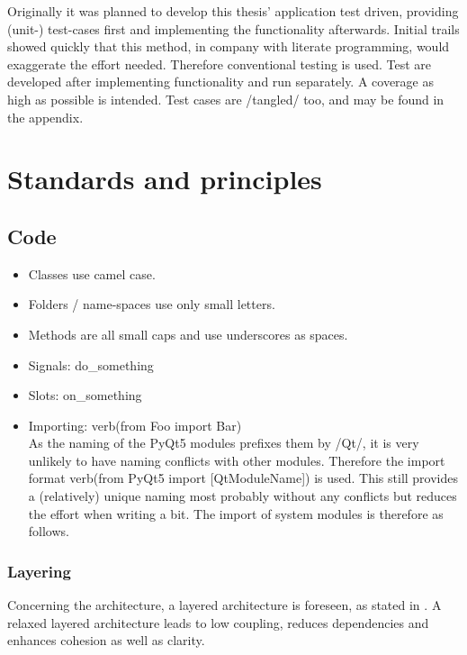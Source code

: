 \documentclass[
    a4paper,      %
    10pt,         %
    openright,    %
    notitlepage,  %
    parskip=half, %
]{scrreprt}       %
\theoremstyle{definition}                    %
\begin{document}
Originally it was planned to develop this thesis' application test driven,
providing (unit-) test-cases first and implementing the functionality
afterwards. Initial trails showed quickly that this method, in company with
literate programming, would exaggerate the effort needed. Therefore conventional
testing is used. Test are developed after implementing functionality and run
separately. A coverage as high as possible is intended. Test cases are /tangled/
too, and may be found in the appendix.

\section{Standards and principles}
\label{sec:standards-principles}

\subsection{Code}
\label{subsec:code}

\begin{itemize}
\item Classes use camel case.
\item Folders / name-spaces use only small letters.
\item Methods are all small caps and use underscores as spaces.
\item Signals: do\_something
\item Slots: on\_something
\item Importing: {{{verb(from Foo import Bar)}}}\\
      As the naming of the PyQt5 modules prefixes them by /Qt/, it is very
      unlikely to have naming conflicts with other modules. Therefore the import
      format {{{verb(from PyQt5 import [QtModuleName])}}} is used. This still
      provides a (relatively) unique naming most probably without any conflicts
      but reduces the effort when writing a bit. The import of system modules is
      therefore as follows.
\end{itemize}

\subsubsection{Layering}
\label{ssubsec:layering}

Concerning the architecture, a layered architecture is foreseen, as stated in
\cite[p. 38 ff.]{osterwalder_qde_2016}. A relaxed layered architecture leads to
low coupling, reduces dependencies and enhances cohesion as well as clarity.
\end{document}
